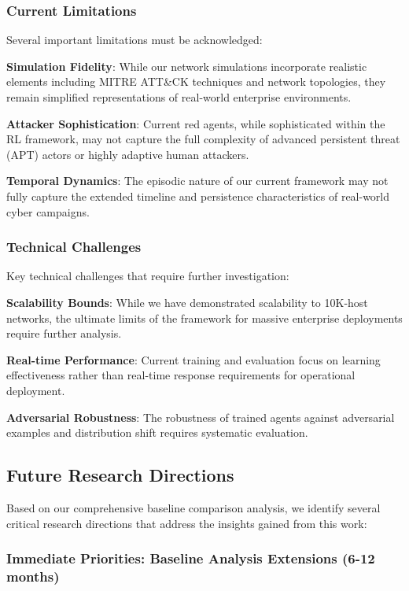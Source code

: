 \documentclass[12pt,twoside]{article}
\theoremstyle{definition}
\theoremstyle{plain}
\begin{document}
\subsubsection{Current Limitations}
Several important limitations must be acknowledged:

\textbf{Simulation Fidelity}: While our network simulations incorporate realistic elements including MITRE ATT\&CK techniques and network topologies, they remain simplified representations of real-world enterprise environments.

\textbf{Attacker Sophistication}: Current red agents, while sophisticated within the RL framework, may not capture the full complexity of advanced persistent threat (APT) actors or highly adaptive human attackers.

\textbf{Temporal Dynamics}: The episodic nature of our current framework may not fully capture the extended timeline and persistence characteristics of real-world cyber campaigns.

\subsubsection{Technical Challenges}
Key technical challenges that require further investigation:

\textbf{Scalability Bounds}: While we have demonstrated scalability to 10K-host networks, the ultimate limits of the framework for massive enterprise deployments require further analysis.

\textbf{Real-time Performance}: Current training and evaluation focus on learning effectiveness rather than real-time response requirements for operational deployment.

\textbf{Adversarial Robustness}: The robustness of trained agents against adversarial examples and distribution shift requires systematic evaluation.

\subsection{Future Research Directions}

Based on our comprehensive baseline comparison analysis, we identify several critical research directions that address the insights gained from this work:

\subsubsection{Immediate Priorities: Baseline Analysis Extensions (6-12 months)}
\end{document}

